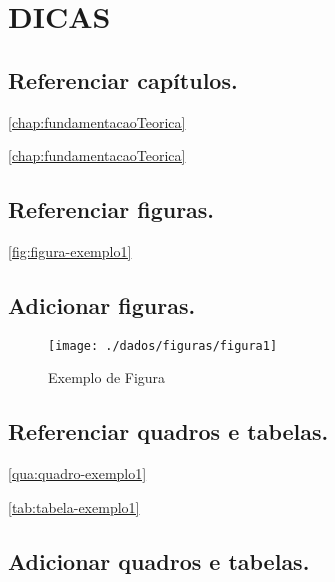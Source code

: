 \chapter{DICAS}
\label{chap:dicas}


\section{Referenciar capítulos.}

\ref{chap:fundamentacaoTeorica}

\autoref{chap:fundamentacaoTeorica}



\section{Referenciar figuras.}

\autoref{fig:figura-exemplo1}

\section{Adicionar figuras.}

\begin{figure}[!htb]
    \centering
    \caption{Exemplo de Figura}
    \texttt{[image: ./dados/figuras/figura1]}
    \label{fig:figura-exemplo1}
\end{figure}



\section{Referenciar quadros e tabelas.}

\autoref{qua:quadro-exemplo1}

\autoref{tab:tabela-exemplo1}

\section{Adicionar quadros e tabelas.}


